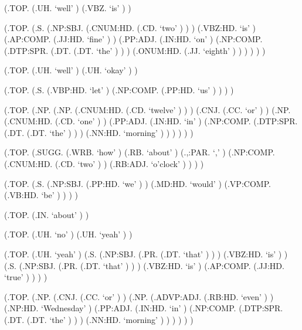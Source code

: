 \documentclass[10pt]{article}
\begin{document}
\begin{parsetree}  (.TOP. (.UH. `well' ) (.VBZ. `is' ) ) \end{parsetree}

\begin{parsetree}  (.TOP. (.S. (.NP:SBJ. (.CNUM:HD. (.CD. `two' ) ) ) (.VBZ:HD. `is' ) (.AP:COMP. (.JJ:HD. `fine' ) ) (.PP:ADJ. (.IN:HD. `on' ) (.NP:COMP. (.DTP:SPR. (.DT. (.DT. `the' ) ) ) (.ONUM:HD. (.JJ. `eighth' ) ) ) ) ) ) \end{parsetree}

\begin{parsetree}  (.TOP. (.UH. `well' ) (.UH. `okay' ) ) \end{parsetree}

\begin{parsetree}  (.TOP. (.S. (.VBP:HD. `let' ) (.NP:COMP. (.PP:HD. `us' ) ) ) ) \end{parsetree}

\begin{parsetree}  (.TOP. (.NP. (.NP. (.CNUM:HD. (.CD. `twelve' ) ) ) (.CNJ. (.CC. `or' ) ) (.NP. (.CNUM:HD. (.CD. `one' ) ) (.PP:ADJ. (.IN:HD. `in' ) (.NP:COMP. (.DTP:SPR. (.DT. (.DT. `the' ) ) ) (.NN:HD. `morning' ) ) ) ) ) ) \end{parsetree}

\begin{parsetree}  (.TOP. (.SUGG. (.WRB. `how' ) (.RB. `about' ) (.,:PAR. `,' ) (.NP:COMP. (.CNUM:HD. (.CD. `two' ) ) (.RB:ADJ. `o'clock' ) ) ) ) \end{parsetree}

\begin{parsetree}  (.TOP. (.S. (.NP:SBJ. (.PP:HD. `we' ) ) (.MD:HD. `would' ) (.VP:COMP. (.VB:HD. `be' ) ) ) ) \end{parsetree}

\begin{parsetree}  (.TOP. (.IN. `about' ) ) \end{parsetree}

\begin{parsetree}  (.TOP. (.UH. `no' ) (.UH. `yeah' ) ) \end{parsetree}

\begin{parsetree}  (.TOP. (.UH. `yeah' ) (.S. (.NP:SBJ. (.PR. (.DT. `that' ) ) ) (.VBZ:HD. `is' ) ) (.S. (.NP:SBJ. (.PR. (.DT. `that' ) ) ) (.VBZ:HD. `is' ) (.AP:COMP. (.JJ:HD. `true' ) ) ) ) \end{parsetree}

\begin{parsetree}  (.TOP. (.NP. (.CNJ. (.CC. `or' ) ) (.NP. (.ADVP:ADJ. (.RB:HD. `even' ) ) (.NP:HD. `Wednesday' ) (.PP:ADJ. (.IN:HD. `in' ) (.NP:COMP. (.DTP:SPR. (.DT. (.DT. `the' ) ) ) (.NN:HD. `morning' ) ) ) ) ) ) \end{parsetree}
\end{document}
